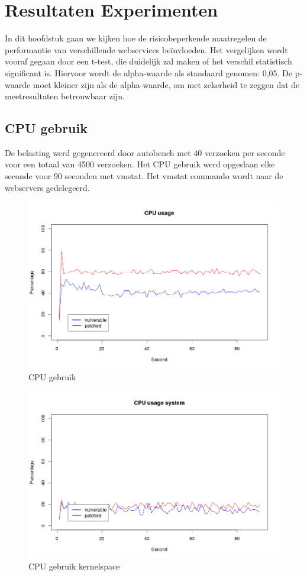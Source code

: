 \chapter{Resultaten Experimenten}
In dit hoofdstuk gaan we kijken hoe de risicobeperkende maatregelen de performantie van verschillende webservices beïnvloeden.
Het vergelijken wordt vooraf gegaan door een t-test, die duidelijk zal maken of het verschil statistisch significant is. Hiervoor wordt de alpha-waarde als standaard genomen: 0,05. De p-waarde moet kleiner zijn als de alpha-waarde, om met zekerheid te zeggen dat de meetresultaten betrouwbaar zijn.

\section{CPU gebruik}
De belasting werd gegenereerd door autobench met 40 verzoeken per seconde voor een totaal van 4500 verzoeken.
Het CPU gebruik werd opgeslaan elke seconde voor 90 seconden met vmstat.
Het vmstat commando wordt naar de webservers gedelegeerd.


\begin{figure}
	\includegraphics[width=1.0\linewidth]{img/cpu_usage.png}
	\caption{CPU gebruik}
	\label{fig:cpu_usage}
\end{figure}

\begin{figure}
	\includegraphics[width=1.0\linewidth]{img/cpu_system.png}
	\caption{CPU gebruik kernelspace}
	\label{fig:cpu_system}
\end{figure}

